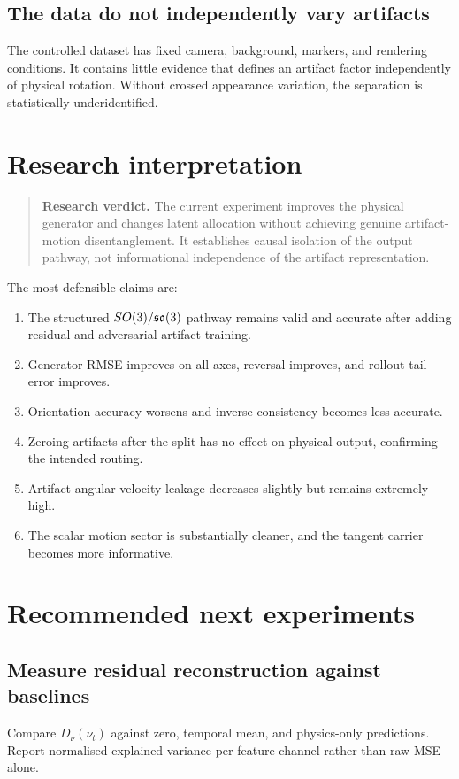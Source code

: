 \documentclass[11pt,a4paper]{article}
\newenvironment{verdict}{\begin{quote}\color{reportblue}\textbf{Research verdict.} }{\end{quote}}
\begin{document}
\subsection{The data do not independently vary artifacts}
The controlled dataset has fixed camera, background, markers, and rendering conditions. It contains little evidence that defines an artifact factor independently of physical rotation. Without crossed appearance variation, the separation is statistically underidentified.

\section{Research interpretation}
\begin{verdict}
The current experiment improves the physical generator and changes latent allocation without achieving genuine artifact-motion disentanglement. It establishes causal isolation of the output pathway, not informational independence of the artifact representation.
\end{verdict}

The most defensible claims are:
\begin{enumerate}
\item The structured $SO(3)/\mathfrak{so}(3)$ pathway remains valid and accurate after adding residual and adversarial artifact training.
\item Generator RMSE improves on all axes, reversal improves, and rollout tail error improves.
\item Orientation accuracy worsens and inverse consistency becomes less accurate.
\item Zeroing artifacts after the split has no effect on physical output, confirming the intended routing.
\item Artifact angular-velocity leakage decreases slightly but remains extremely high.
\item The scalar motion sector is substantially cleaner, and the tangent carrier becomes more informative.
\end{enumerate}

\section{Recommended next experiments}
\subsection{Measure residual reconstruction against baselines}
Compare $D_\nu(\nu_t)$ against zero, temporal mean, and physics-only predictions. Report normalised explained variance per feature channel rather than raw MSE alone.
\end{document}
